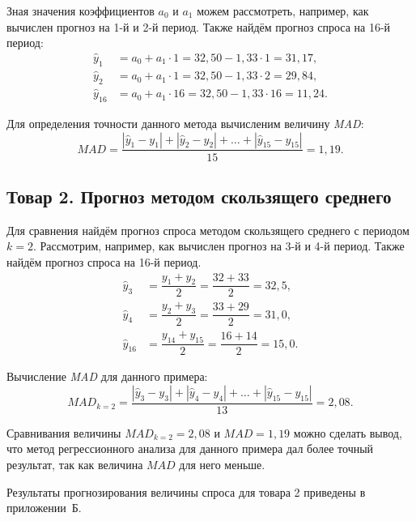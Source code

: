Зная значения коэффициентов $a_0$ и $a_1$ можем рассмотреть, например, как
вычислен прогноз на 1-й и 2-й период. Также найдём
прогноз спроса на 16-й период:
\begin{align*}
  \hat{y}_1 &= a_0 + a_1 \cdot 1 = 32{,}50 - 1{,}33 \cdot 1 = 31{,}17 , \\
  \hat{y}_2 &= a_0 + a_1 \cdot 1 =  32{,}50 - 1{,}33 \cdot 2 = 29{,}84, \\
  \hat{y}_{16} &= a_0 + a_1 \cdot 16 =  32{,}50 - 1{,}33 \cdot 16 = 11{,}24.
\end{align*}

Для определения точности данного метода вычисленим величину \textit{MAD}:
\[
  MAD = \dfrac{|\hat{y}_1 - y_1| + |\hat{y}_2 - y_2| + \dots + |\hat{y}_{15} - y_{15}|}{15} = 1{,}19.
\]


\subsection{Товар 2. Прогноз методом скользящего среднего}

Для сравнения найдём прогноз спроса методом скользящего среднего
с периодом $k = 2$. Рассмотрим, например, как вычислен прогноз
на 3-й и 4-й период. Также найдём прогноз спроса на 16-й период.
\begin{align*}
  \hat{y}_3 &= \dfrac{y_1 + y_2}{2} = \dfrac{32 + 33}{2} = 32{,}5, \\
  \hat{y}_4 &= \dfrac{y_2 + y_3}{2} = \dfrac{33 + 29}{2} = 31{,}0, \\
  \hat{y}_{16} &= \dfrac{y_{14} + y_{15}}{2} = \dfrac{16 + 14}{2} = 15{,}0.
\end{align*}

Вычисление \textit{MAD} для данного примера:
\[
  MAD_{k = 2} = \dfrac{|\hat{y}_3 - y_3| + |\hat{y}_4 - y_4| + \dots + |\hat{y}_{15} - y_{15}|}{13} = 2{,}08.
\]

Сравнивания величины $MAD_{k = 2} = 2{,}08$ и $MAD = 1{,}19$ можно сделать вывод, что
метод регрессионного анализа для данного примера дал более точный результат, так как
величина $MAD$ для него меньше.

Результаты прогнозирования величины спроса для товара 2 приведены в приложении~Б.




